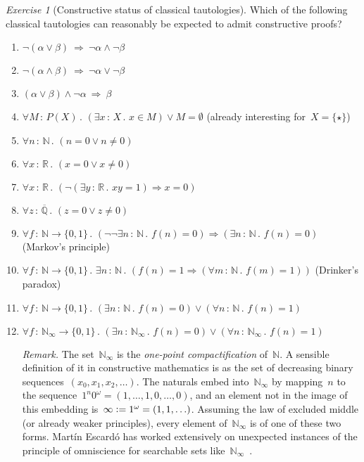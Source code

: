 \documentclass[10pt,reqno,a4paper,openany]{amsbook}
\theoremstyle{definition}
\theoremstyle{plain}
\theoremstyle{remark}
\newcommand{\NN}{\mathbb{N}}
\newcommand{\RR}{\mathbb{R}}
\newcommand{\QQ}{\mathbb{Q}}
\newcommand{\?}{\,{:}\,}
\renewcommand{\_}{\mathpunct{.}\,}
\newcommand{\defeq}{\vcentcolon=}
\newtheorem{exercise}[defn]{Exercise}
\begin{document}
\begin{exercise}[Constructive status of classical tautologies]
Which of the following classical tautologies can reasonably be expected to
admit constructive proofs?
\begin{enumerate}
\item $\neg(\alpha \vee \beta) \ \Longrightarrow\ \neg\alpha \wedge \neg\beta$
\item $\neg(\alpha \wedge \beta) \ \Longrightarrow\ \neg\alpha \vee \neg\beta$
\item $(\alpha \vee \beta) \wedge \neg\alpha \ \Longrightarrow\ \beta$
\item $\forall M\?P(X)\_ (\exists x\?X\_ x \in M) \vee M = \emptyset$
(already interesting for~$X = \{\star\}$)
\item $\forall n\?\NN\_ (n = 0 \vee n \neq 0)$
\item $\forall x\?\RR\_ (x = 0 \vee x \neq 0)$
\item $\forall x\?\RR\_ (\neg(\exists y\?\RR\_ xy=1) \Rightarrow x = 0)$
\item $\forall z\?\overline{\QQ}\_ (z = 0 \vee z \neq 0)$
\item $\forall f \? \NN \to \{0,1\}\_ (\neg\neg\exists n \? \NN\_ f(n) = 0)
\Rightarrow (\exists n \? \NN\_ f(n) = 0)$ (Markov's principle)
\item $\forall f \? \NN \to \{0,1\}\_ \exists n \? \NN\_ (f(n) = 1
\Rightarrow (\forall m \? \NN\_ f(m) = 1))$ (Drinker's paradox)
\item $\forall f \? \NN \to \{0,1\}\_ (\exists n \? \NN\_ f(n) = 0) \vee
(\forall n \? \NN\_ f(n) = 1)$
\item $\forall f \? \NN_\infty \to \{0,1\}\_ (\exists n \? \NN_\infty\_ f(n) = 0) \vee
(\forall n \? \NN_\infty\_ f(n) = 1)$

{\noindent\scriptsize\emph{Remark.} The set~$\NN_\infty$ is the \emph{one-point
compactification} of~$\NN$. A sensible definition of it in constructive mathematics
is as the set of decreasing binary sequences~$(x_0,x_1,x_2,\ldots)$. The
naturals embed into~$\NN_\infty$ by mapping~$n$ to the sequence~$1^n 0^\omega =
(1,\ldots,1,0,\ldots,0)$, and an element not in the image of this embedding
is~$\infty \defeq 1^\omega = (1,1,\ldots)$. Assuming the law of excluded
middle (or already weaker principles), every element of~$\NN_\infty$ is of one
of these two forms. Martín Escardó has worked extensively on unexpected
instances of the principle of omniscience for searchable sets
like~$\NN_\infty$~\cite{escardo:omniscience1,escardo:omniscience2,escardo:omniscience}.\par}
\end{enumerate}
\end{exercise}
\end{document}
